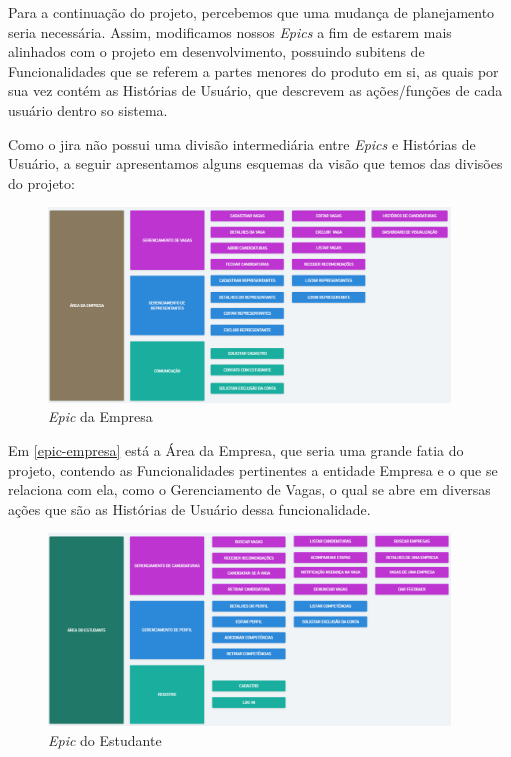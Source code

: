 Para a continuação do projeto, percebemos que uma mudança de planejamento seria necessária. Assim, modificamos nossos \textit{Epics} a fim de estarem mais alinhados com o projeto em desenvolvimento, possuindo subitens de Funcionalidades que se referem a partes menores do produto em si, as quais por sua vez contém as Histórias de Usuário, que descrevem as ações/funções de cada usuário dentro so sistema.

Como o \gls{jira} não possui uma divisão intermediária entre \textit{Epics} e Histórias de Usuário, a seguir apresentamos alguns esquemas da visão que temos das divisões do projeto:

\begin{figure}[H]
	\centering
	\caption{\label{epic-empresa}\textit{Epic} da Empresa}
	\includegraphics[width=0.95\textwidth]{../imagens/epic-empresa.png}
\end{figure}

Em \autoref{epic-empresa} está a Área da Empresa, que seria uma grande fatia do projeto, contendo as Funcionalidades pertinentes a entidade Empresa e o que se relaciona com ela, como o Gerenciamento de Vagas, o qual se abre em diversas ações que são as Histórias de Usuário dessa funcionalidade.

\begin{figure}[H]
	\centering
	\caption{\label{epic-estudante}\textit{Epic} do Estudante}
	\includegraphics[width=0.95\textwidth]{../imagens/epic-estudante.png}
\end{figure}

